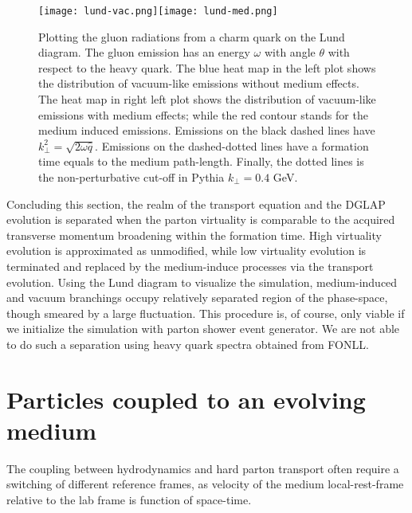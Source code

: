 \begin{figure}
\texttt{[image: lund-vac.png]}\texttt{[image: lund-med.png]}
\caption{Plotting the gluon radiations from a charm quark on the Lund diagram. The gluon emission has an energy $\omega$ with angle $\theta$ with respect to the heavy quark. The blue heat map in the left plot shows the distribution of vacuum-like emissions without medium effects. The heat map in right left plot shows the distribution of vacuum-like emissions with medium effects; while the red contour stands for the medium induced emissions. Emissions on the black dashed lines have $k_\perp^2 = \sqrt{2\omega \hat{q}}$. Emissions on the dashed-dotted lines have a formation time equals to the medium path-length. Finally, the dotted lines is the non-perturbative cut-off in Pythia $k_\perp = 0.4$ GeV.}
\label{fig:lund}
\end{figure}

Concluding this section, the realm of the transport equation and the DGLAP evolution is separated when the parton virtuality is comparable to the acquired transverse momentum broadening within the formation time.
High virtuality evolution is approximated as unmodified, while low virtuality evolution is terminated and replaced by the medium-induce processes via the transport evolution. 
Using the Lund diagram to visualize the simulation, medium-induced and vacuum branchings occupy relatively separated region of the phase-space, though smeared by a large fluctuation.
This procedure is, of course, only viable if we initialize the simulation with parton shower event generator.
We are not able to do such a separation using heavy quark spectra obtained from FONLL.

\section{Particles coupled to an evolving medium}
\label{section:couple-to-hydro}
The coupling between hydrodynamics and hard parton transport often require a switching of different reference frames, as velocity of the medium local-rest-frame relative to the lab frame is function of space-time.

